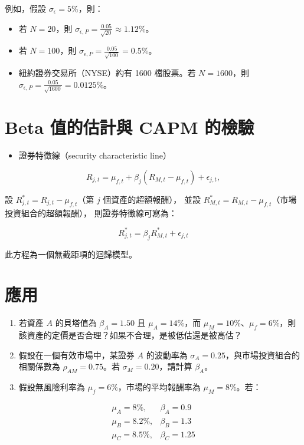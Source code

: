 \documentclass[letterpaper]{article}
\begin{document}
例如，假設 $\sigma_{\epsilon} = 5\%$，則：


\begin{itemize}
	\item 若 $N = 20$，則 $\sigma_{\epsilon, P} = \frac{0.05}{\sqrt{20}} \approx 1.12\%$。
	\item 若 $N = 100$，則 $\sigma_{\epsilon, P} = \frac{0.05}{\sqrt{100}} = 0.5\%$。
	\item 紐約證券交易所（NYSE）約有 1600 檔股票。若 $N = 1600$，則 $\sigma_{\epsilon, P} = \frac{0.05}{\sqrt{1600}} = 0.0125\%$。
\end{itemize}


\section{Beta 值的估計與 CAPM 的檢驗}
\begin{itemize}
	\item 證券特徵線（security characteristic line）
\end{itemize}

$$
R_{j, t}=\mu_{f, t}+\beta_{j}\left(R_{M, t}-\mu_{f, t}\right)+\epsilon_{j, t},
$$

設 $R_{j, t}^{*} = R_{j, t} - \mu_{f, t}$（第 $j$ 個資產的超額報酬），
並設 $R_{M, t}^{*} = R_{M, t} - \mu_{f, t}$（市場投資組合的超額報酬），
則證券特徵線可寫為：

$$
R_{j, t}^{*} = \beta_{j} R_{M, t}^{*} + \epsilon_{j, t}
$$

此方程為一個無截距項的迴歸模型。

\section*{應用}
\begin{enumerate}
	\item 若資產 $A$ 的貝塔值為 $\beta_{A}=1.50$ 且 $\mu_{A}=14\%$，而 $\mu_{M}=10\%$、$\mu_{f}=6\%$，則該資產的定價是否合理？如果不合理，是被低估還是被高估？
	\item 假設在一個有效市場中，某證券 $A$ 的波動率為 $\sigma_{A}=0.25$，與市場投資組合的相關係數為 $\rho_{AM}=0.75$。若 $\sigma_{M}=0.20$，請計算 $\beta_{A}$。
	\item 假設無風險利率為 $\mu_{f}=6\%$，市場的平均報酬率為 $\mu_{M}=8\%$。若：
\end{enumerate}


$$
\begin{array}{ll}
\mu_{A}=8 \%, & \beta_{A}=0.9 \\
\mu_{B}=8.2 \%, & \beta_{B}=1.3 \\
\mu_{C}=8.5 \%, & \beta_{C}=1.25
\end{array}
$$
\end{document}
